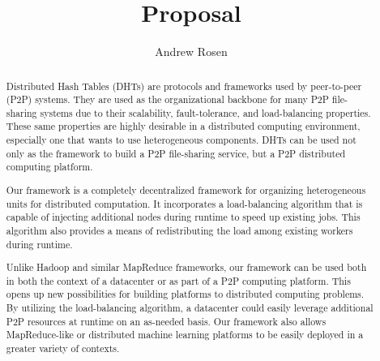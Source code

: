 \documentclass[10pt,letterpaper]{report}
\title{Proposal}
\author{Andrew Rosen}
\begin{document}
\maketitle
\setcounter{tocdepth}{4}
\tableofcontents
\newpage

\begin{abstract}
Distributed Hash Tables (DHTs) are protocols and frameworks used by peer-to-peer (P2P) systems.
They are used as the organizational backbone for many P2P file-sharing systems due to their scalability, fault-tolerance, and load-balancing properties.
These same properties are highly desirable in a distributed computing environment, especially one that wants to use heterogeneous components.
DHTs can be used not only as the framework to build a P2P file-sharing service, but a P2P distributed computing platform.

Our framework is a completely decentralized framework for organizing heterogeneous units for distributed computation.
It incorporates a load-balancing algorithm that is capable of injecting additional nodes during runtime to speed up existing jobs.
This algorithm also provides a means of redistributing the load among existing workers during runtime.

Unlike Hadoop and similar MapReduce frameworks, our framework can be used both in both the context of a datacenter or as part of a P2P computing platform.  
This opens up new possibilities for building platforms to distributed computing problems.
By utilizing the load-balancing algorithm, a datacenter could easily leverage additional P2P resources at runtime on an as-needed basis.
Our framework also allows MapReduce-like or distributed machine learning platforms to be easily deployed in a greater variety of contexts.

\end{abstract}





%



\end{document}
